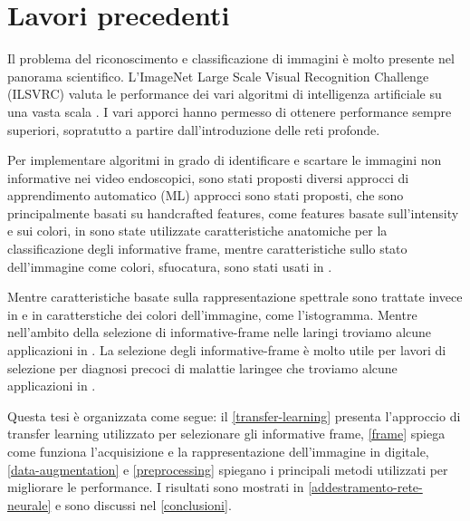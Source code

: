 \section{Lavori precedenti}\label{lavori-precedenti}

Il problema del riconoscimento e classificazione di immagini è molto presente nel panorama scientifico. L'ImageNet Large Scale Visual Recognition Challenge (ILSVRC) valuta le performance dei vari algoritmi di intelligenza artificiale su una vasta scala \cite{imagenet}. I vari apporci hanno permesso di ottenere performance sempre superiori, sopratutto a partire dall'introduzione delle reti profonde.

Per implementare algoritmi in grado di identificare e scartare le immagini non informative nei video endoscopici, sono stati proposti diversi approcci di apprendimento automatico (ML) approcci sono stati proposti, che sono principalmente basati su handcrafted features, come features basate sull'intensity e sui colori, in \cite{zhang_colon} sono state utilizzate caratteristiche anatomiche per la classificazione degli informative frame, mentre caratteristiche sullo stato dell'immagine come colori, sfuocatura, sono stati usati in \cite{armin_colonscopy}. 

Mentre caratteristiche basate sulla rappresentazione spettrale sono trattate invece in \cite{atasoy_endoscopic} \cite{haji_wce} e in \cite{bashar_endoscopy} caratterstiche dei colori dell'immagine, come l'istogramma. Mentre nell'ambito della selezione di informative-frame nelle laringi  troviamo alcune applicazioni in \cite{moccia_workflow} \cite{moccia_larynge_2} \cite{patrini_tl}. La selezione degli informative-frame è molto utile per lavori di selezione per diagnosi precoci di malattie laringee che troviamo alcune applicazioni in \cite{moccia_larynge} \cite{turkmen_larynge} \cite{narbalata_larynge}.

Questa tesi è organizzata come segue: il \cref{transfer-learning} presenta l'approccio di transfer learning utilizzato per selezionare gli informative frame, \cref{frame} spiega come funziona l'acquisizione e la rappresentazione dell'immagine in digitale, \cref{data-augmentation}  e  \cref{preprocessing} spiegano i principali metodi utilizzati per migliorare le performance. I risultati sono mostrati in \cref{addestramento-rete-neurale} e sono discussi nel \cref{conclusioni}.
